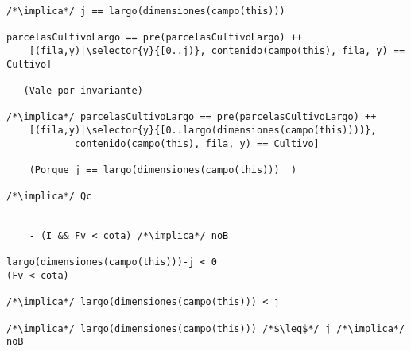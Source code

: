 \begin{lstlisting}
/*\implica*/ j == largo(dimensiones(campo(this)))

parcelasCultivoLargo == pre(parcelasCultivoLargo) ++ 
    [(fila,y)|\selector{y}{[0..j)}, contenido(campo(this), fila, y) == Cultivo]
  
   (Vale por invariante)

/*\implica*/ parcelasCultivoLargo == pre(parcelasCultivoLargo) ++ 
    [(fila,y)|\selector{y}{[0..largo(dimensiones(campo(this))))}, 
    		contenido(campo(this), fila, y) == Cultivo]

	(Porque j == largo(dimensiones(campo(this)))  )

/*\implica*/ Qc

	
    - (I && Fv < cota) /*\implica*/ noB
    
largo(dimensiones(campo(this)))-j < 0
(Fv < cota)

/*\implica*/ largo(dimensiones(campo(this))) < j

/*\implica*/ largo(dimensiones(campo(this))) /*$\leq$*/ j /*\implica*/ noB

\end{lstlisting}


